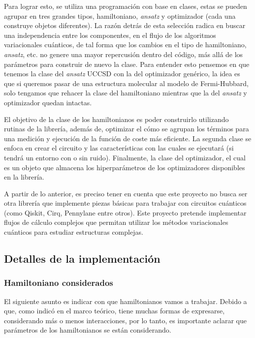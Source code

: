 Para lograr esto, se utiliza una programación con base en clases, estas se pueden agrupar en tres grandes tipos, hamiltoniano, \textit{ansatz} y optimizador (cada una construye objetos diferentes). La razón detrás de esta selección radica en buscar una independencia entre los componentes, en el flujo de los algoritmos variacionales cuánticos, de tal forma que los cambios en el tipo de hamiltoniano, \textit{ansatz}, etc. no genere una mayor repercusión dentro del código, más allá de los parámetros para construir de nuevo la clase. Para entender esto pensemos en que tenemos la clase del \textit{ansatz} UCCSD con la del optimizador genérico, la idea es que si queremos pasar de una estructura molecular al modelo de Fermi-Hubbard, solo tengamos que rehacer la clase del hamiltoniano mientras que la del \textit{ansatz} y optimizador quedan intactas.


El objetivo de la clase de los hamiltonianos es poder construirlo utilizando rutinas de la librería, además de, optimizar el cómo se agrupan los términos para una medición y ejecución de la función de coste más eficiente. La segunda clase se enfoca en crear el circuito y las características con las cuales se ejecutará (si tendrá un entorno con o sin ruido). Finalmente, la clase del optimizador, el cual es un objeto que almacena los hiperparámetros de los optimizadores disponibles en la librería.

A partir de lo anterior, es preciso tener en cuenta que este proyecto no busca ser otra librería que implemente piezas básicas para trabajar con circuitos cuánticos (como Qiskit, Cirq, Pennylane entre otros). Este proyecto pretende implementar flujos de cálculo complejos que permitan utilizar los métodos variacionales cuánticos para estudiar estructuras complejas.


\subsection{Detalles de la implementación}

\subsubsection{Hamiltoniano considerados}
El siguiente asunto es indicar con que hamiltonianos vamos a trabajar. Debido a que, como indicó en el marco teórico, tiene muchas formas de expresarse, considerando más o menos interacciones, por lo tanto, es importante aclarar que parámetros de los hamiltonianos se están considerando.

